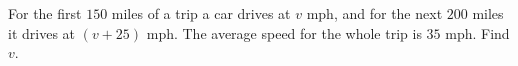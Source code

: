 For the first $150$ miles of a trip a car drives at $v$ mph, and for the next $200$ miles it drives at $(v+25)$ mph. The average speed for the whole trip is $35$ mph. Find $v$.

